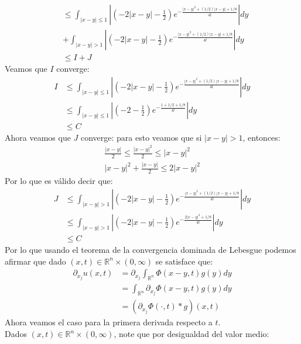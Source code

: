 \begin{homeworkProblem}
\begin{solucion}
\begin{enumerate}
\begin{align*}
          &\leq \int_{|x-y|\leq 1} \left| \left(-2|x-y| -\frac{1}{2}\right)e^{-\frac{|x-y|^2+(1/2)|x-y|+1/8}{4t}}\right|dy\\
          &+ \int_{|x-y|>1} \left| \left(-2|x-y| -\frac{1}{2}\right)e^{-\frac{|x-y|^2+(1/2)|x-y|+1/8}{4t}}\right|dy\\
          &\leq I + J
        \end{align*}
        Veamos que $I$ converge:
        \begin{align*}
          I&\leq \int_{|x-y|\leq 1} \left| \left(-2|x-y| -\frac{1}{2}\right)e^{-\frac{|x-y|^2+(1/2)|x-y|+1/8}{4t}}\right|dy\\
          &\leq \int_{|x-y|\leq 1} \left| \left(-2 -\frac{1}{2}\right)e^{-\frac{1+1/2+1/8}{4t}}\right|dy\\
          &\leq C
        \end{align*}
        Ahora veamos que $J$ converge:
        para esto veamos que si $|x-y|>1$, entonces:
        \begin{align*}
          \frac{|x-y|}{2}\leq\frac{|x-y|^2}{2}\leq |x-y|^2\\
          |x-y|^2+\frac{|x-y|}{2}\leq 2|x-y|^2
        \end{align*}
        Por lo que es válido decir que:
        \begin{align*}
          J&\leq \int_{|x-y|>1} \left| \left(-2|x-y| -\frac{1}{2}\right)e^{-\frac{|x-y|^2+(1/2)|x-y|+1/8}{4t}}\right|dy\\
          &\leq \int_{|x-y|>1} \left| \left(-2|x-y| -\frac{1}{2}\right)e^{-\frac{2|x-y|^2+1/8}{4t}}\right|dy\\
          &\leq C
        \end{align*}
        Por lo que usando el teorema de la convergencia dominada de Lebesgue podemos afirmar que dado $(x,t)\in\mathbb{R}^{n}\times (0,\infty)$ se satisface que:
          \begin{align*}
            \partial_{x_j}u(x,t)&=\partial_{x_j}\int_{\mathbb{R}^{n}}\Phi(x-y,t)g(y)dy\\
            &=\int_{\mathbb{R}^{n}}\partial_{x_j}\Phi(x-y,t)g(y)dy\\
            &=(\partial_{x_j}\Phi(\cdot,t)*g)(x,t)
          \end{align*}
        Ahora veamos el caso para la primera derivada respecto a $t$.\\
        Dados $(x,t)\in\mathbb{R}^{n}\times (0,\infty)$, note que por desigualdad del valor medio:
        \begin{align*}

\end{align*}
\end{enumerate}
\end{solucion}
\end{homeworkProblem}

